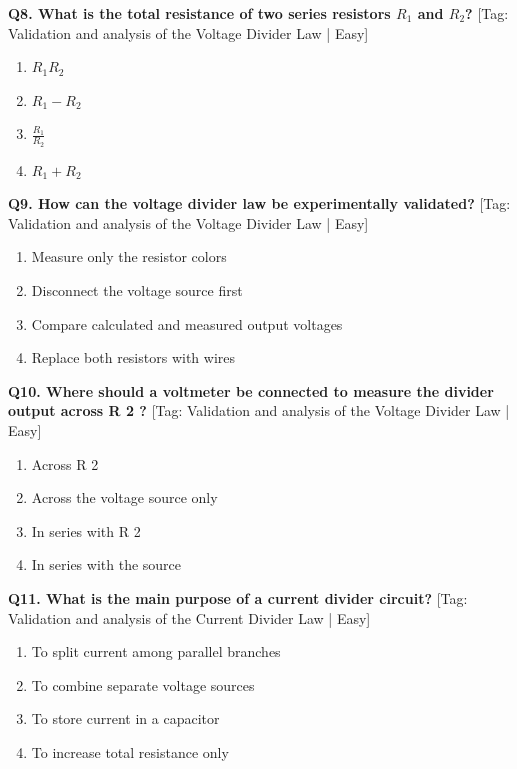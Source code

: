 \noindent\textbf{Q8. What is the total resistance of two series resistors $R_1$ and $R_2$?} \hfill [Tag: Validation and analysis of the Voltage Divider Law | Easy]
\begin{enumerate}[label=(\alph*),topsep=2pt,itemsep=1pt,partopsep=0pt,parsep=0pt]
    \item {$R_1 R_2$}
    \item {$R_1 - R_2$}
    \item {$\frac{R_1}{R_2}$}
    \item {$R_1 + R_2$}
\end{enumerate}
\vspace{2mm}

\noindent\textbf{Q9. How can the voltage divider law be experimentally validated?} \hfill [Tag: Validation and analysis of the Voltage Divider Law | Easy]
\begin{enumerate}[label=(\alph*),topsep=2pt,itemsep=1pt,partopsep=0pt,parsep=0pt]
    \item {Measure only the resistor colors}
    \item {Disconnect the voltage source first}
    \item {Compare calculated and measured output voltages}
    \item {Replace both resistors with wires}
\end{enumerate}
\vspace{2mm}

\noindent\textbf{Q10. Where should a voltmeter be connected to measure the divider output across R 2 ?} \hfill [Tag: Validation and analysis of the Voltage Divider Law | Easy]
\begin{enumerate}[label=(\alph*),topsep=2pt,itemsep=1pt,partopsep=0pt,parsep=0pt]
    \item {Across R 2}
    \item {Across the voltage source only}
    \item {In series with R 2}
    \item {In series with the source}
\end{enumerate}
\vspace{2mm}

\noindent\textbf{Q11. What is the main purpose of a current divider circuit?} \hfill [Tag: Validation and analysis of the Current Divider Law | Easy]
\begin{enumerate}[label=(\alph*),topsep=2pt,itemsep=1pt,partopsep=0pt,parsep=0pt]
    \item {To split current among parallel branches}
    \item {To combine separate voltage sources}
    \item {To store current in a capacitor}
    \item {To increase total resistance only}
\end{enumerate}
\vspace{2mm}

